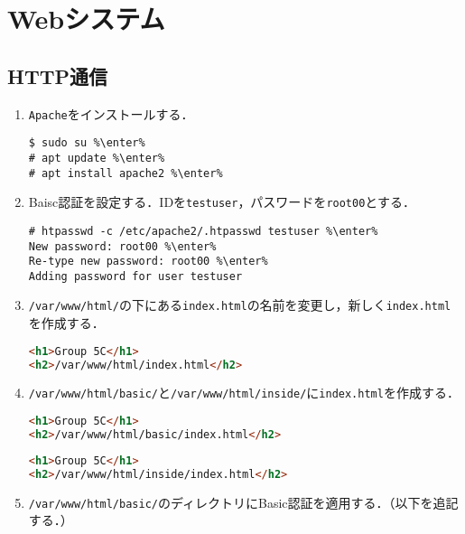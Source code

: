 \documentclass{jlreq}
\begin{document}
\begin{framed}
    \tableofcontents
\end{framed}
\section{Webシステム}
\subsection{HTTP通信}
\newcommand{\apache}{\texttt{Apache}}
\begin{enumerate}
    \item \apache をインストールする．
          \begin{lstlisting}
$ sudo su %\enter%
# apt update %\enter%
# apt install apache2 %\enter%
    \end{lstlisting}
    \item Baisc認証を設定する．IDを\texttt{testuser}，パスワードを\texttt{root00}とする．
          \begin{lstlisting}
# htpasswd -c /etc/apache2/.htpasswd testuser %\enter%
New password: root00 %\enter%
Re-type new password: root00 %\enter%
Adding password for user testuser
\end{lstlisting}
    \item \texttt{/var/www/html/}の下にある\texttt{index.html}の名前を変更し，新しく\texttt{index.html}を作成する．
          \begin{lstlisting}[style=file,caption={\ttfamily /var/www/html/index.html},language=html]
<h1>Group 5C</h1>
<h2>/var/www/html/index.html</h2>
    \end{lstlisting}
    \item \texttt{/var/www/html/basic/}と\texttt{/var/www/html/inside/}に\texttt{index.html}を作成する．
          \begin{lstlisting}[style=file,language=html,caption={\ttfamily /var/www/html/basic/index.html}]
<h1>Group 5C</h1>
<h2>/var/www/html/basic/index.html</h2>
\end{lstlisting}
          \begin{lstlisting}[style=file,language=html,caption={\ttfamily /var/www/html/inside/index.html}]
<h1>Group 5C</h1>
<h2>/var/www/html/inside/index.html</h2>
    \end{lstlisting}
    \item \texttt{/var/www/html/basic/}のディレクトリにBasic認証を適用する．（以下を追記する．）
          \begin{lstlisting}[style=file,caption={\ttfamily /etc/apache2/sites-available/000-default.conf},label={src:basic}]

\end{lstlisting}
\end{enumerate}
\end{document}

